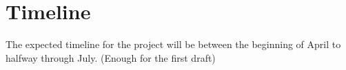 \section{Timeline}
The expected timeline for the project will be between the beginning of April to halfway through July. (Enough for the first draft)